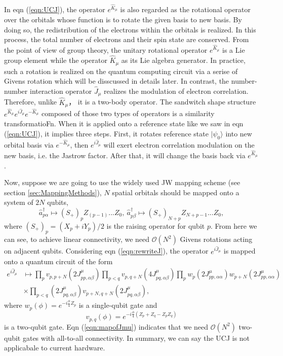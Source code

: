 In eqn (\ref{eqn:UCJ}), the operator $e^{\hat{K}_\mu}$ is also regarded as the rotational operator over the orbitals whose function is to rotate the given basis to new basis. By doing so, the redistribution of the electrons within the orbitals is realized. In this process, the total number of electrons and their spin state are conserved. From the point of view of group theory, the unitary rotational operator $e^{\hat{K}_\mu}$ is a Lie group element while the operator $\hat{K}_\mu$ as its Lie algebra generator. In practice, such a rotation is realized on the quantum computing circuit via a serise of Givens rotation which will be disscussed in details later. In contrast, the number-number interaction operator $\hat{J}_\mu$ realizes the modulation of electron correlation. Therefore, unlike $\hat{K}_\mu$， it is a two-body operator. The sandwitch shape structure $e^{\hat{K}_\mu}e^{i\hat{J}_\mu}e^{-\hat{K}_\mu}$ composed of those two types of operators is a similarity transformatioFn. When it is applied onto a reference state like we saw in eqn (\ref{eqn:UCJ}), it implies three steps. First, it rotates reference state $|\psi_0\rangle$ into new orbital basis via $e^{-\hat{K}_\mu}$, then $e^{i\hat{J}_\mu}$ will exert electron correlation modulation on the new basis, i.e. the Jastrow factor. After that, it will change the basis back via $e^{\hat{K}_\mu}$.

Now, suppose we are going to use the widely used JW mapping scheme (see section \ref{sec:MappingMethods}), $N$ spatial orbitals should be mapped onto a system of $2N$ qubits,
\begin{equation}
    \hat{a}^\dagger_{p\alpha}\mapsto(S_+)_p Z_{(p-1)}... Z_0, \: \hat{a}^\dagger_{p\beta}\mapsto(S_+)_{N+p} Z_{N+p-1}...Z_0,
\end{equation}
where $(S_+)_p=(X_p+iY_p)/2$ is the raising operator for qubit $p$. From here we can see, to achieve linear connectivity, we need $\mathcal{O}(N^2)$ Givens rotations acting on adjacent qubits. Considering eqn (\ref{eqn:rewriteJ}), the operator $e^{i\hat{J}_\mu}$ is mapped onto a quantum circuit of the form
\begin{equation}
    \begin{split}
        e^{i\hat{J}_\mu}&\mapsto\prod_p v_{p,p+N}(2J_{pp,\alpha\beta}^\mu)\prod_{p<q}v_{p,q+N}(4J_{pq,\alpha\beta}^\mu)\prod_{p}w_p(2J_{pp,\alpha\alpha}^\mu)w_{p+N}(2J_{pp,\alpha\alpha}^\mu) \\
    &\times\prod_{p<q}(2J_{pq,\alpha\beta}^\mu)v_{p+N,q+N}(2J_{pq,\alpha\beta}^\mu),
    \end{split}   
    \label{eqn:mapofJmu} 
\end{equation}
where $w_p(\phi)=e^{-i\frac{\phi}{4}Z_p}$ is a single-qubit gate and
\begin{equation}
    v_{p,q}(\phi)=e^{-i\frac{\phi}{4}(Z_p+Z_q-Z_pZ_q)}
\end{equation}
is a two-qubit gate. Eqn (\ref{eqn:mapofJmu}) indicates that we need $\mathcal{O}(N^2)$ two-qubit gates with all-to-all connectivity. In summary, we can say the UCJ is not applicabale to current hardware.
